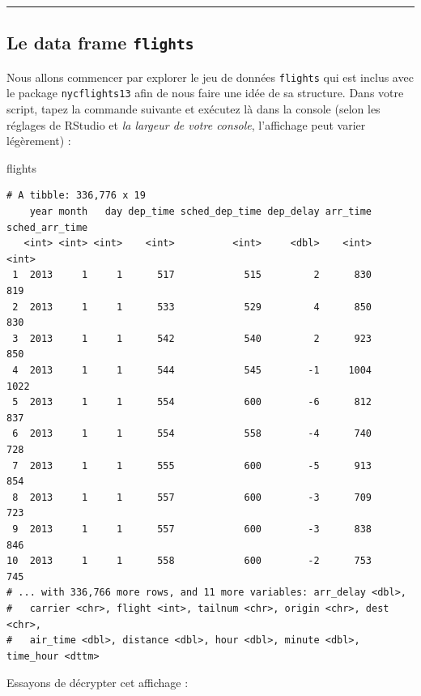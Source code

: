 \documentclass[a4paperpaper,]{article}
\newenvironment{Shaded}{\begin{snugshade}}{\end{snugshade}}
\newcommand{\NormalTok}[1]{\textcolor[rgb]{0.12,0.11,0.11}{#1}}
\theoremstyle{definition}
\theoremstyle{definition}
\theoremstyle{definition}
\theoremstyle{remark}
\begin{document}
\begin{center}\rule{0.5\linewidth}{\linethickness}\end{center}

\hypertarget{le-data-frame-flights}{%
\subsection{\texorpdfstring{Le data frame
\texttt{flights}}{Le data frame flights}}\label{le-data-frame-flights}}

Nous allons commencer par explorer le jeu de données \texttt{flights}
qui est inclus avec le package \texttt{nycflights13} afin de nous faire
une idée de sa structure. Dans votre script, tapez la commande suivante
et exécutez là dans la console (selon les réglages de RStudio et
\emph{la largeur de votre console}, l'affichage peut varier légèrement)
:

\begin{Shaded}
\begin{Highlighting}[]
\NormalTok{flights}
\end{Highlighting}
\end{Shaded}

\begin{verbatim}
# A tibble: 336,776 x 19
    year month   day dep_time sched_dep_time dep_delay arr_time sched_arr_time
   <int> <int> <int>    <int>          <int>     <dbl>    <int>          <int>
 1  2013     1     1      517            515         2      830            819
 2  2013     1     1      533            529         4      850            830
 3  2013     1     1      542            540         2      923            850
 4  2013     1     1      544            545        -1     1004           1022
 5  2013     1     1      554            600        -6      812            837
 6  2013     1     1      554            558        -4      740            728
 7  2013     1     1      555            600        -5      913            854
 8  2013     1     1      557            600        -3      709            723
 9  2013     1     1      557            600        -3      838            846
10  2013     1     1      558            600        -2      753            745
# ... with 336,766 more rows, and 11 more variables: arr_delay <dbl>,
#   carrier <chr>, flight <int>, tailnum <chr>, origin <chr>, dest <chr>,
#   air_time <dbl>, distance <dbl>, hour <dbl>, minute <dbl>, time_hour <dttm>
\end{verbatim}

Essayons de décrypter cet affichage :
\end{document}
